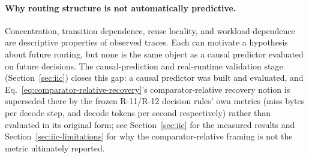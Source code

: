 \paragraph{Why routing structure is not automatically predictive.}
Concentration, transition dependence, reuse locality, and workload
dependence are descriptive properties of observed traces. Each can
motivate a hypothesis about future routing, but none is the same object as
a causal predictor evaluated on future decisions. The causal-prediction
and real-runtime validation stage (Section~\ref{sec:iic}) closes this gap: a causal predictor was built and
evaluated, and Eq.~\eqref{eq:comparator-relative-recovery}'s comparator-relative
recovery notion is superseded there by the frozen R-11/R-12 decision
rules' own metrics (miss bytes per decode step, and decode tokens per
second respectively) rather than evaluated in
its original form; see Section~\ref{sec:iic} for the measured results and
Section~\ref{sec:iic-limitations} for why the comparator-relative framing is
not the metric ultimately reported.
